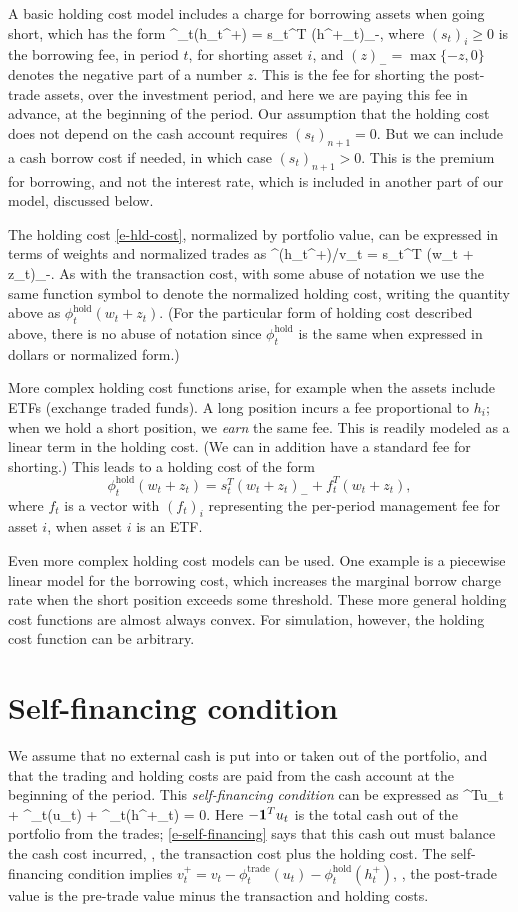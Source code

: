 \documentclass[openany]{article}  %
\newcommand{\trcost}{\phi^\mathrm{trade}}
\newcommand{\hldcost}{\phi^\mathrm{hold}}
\begin{document}
A basic holding cost model includes
a charge for borrowing assets when going short, which has the form
\BEQ\label{e-hld-cost}
\hldcost_t(h_t^+) =  s_t^T (h^+_t)_-,
\EEQ
where $(s_t)_i \geq 0$ is the borrowing fee,
in period $t$, for shorting asset $i$,
and $(z)_- =\max\{-z,0\}$ denotes the negative part of a number $z$.
This is the fee for shorting
the post-trade assets, over the investment period, and here we are paying this
fee in advance, at the beginning of the period.
Our assumption that the holding cost does not depend on the cash account
requires $(s_t)_{n+1} =0$.  But we can include a cash borrow cost if needed,
in which case $(s_t)_{n+1}>0$.  This is the premium for borrowing, and not
the interest rate, which is included in another part of our model,
discussed below.

The holding cost \eqref{e-hld-cost}, normalized by portfolio value,
can be expressed in terms of weights and normalized trades as
\BEQ\label{e-hld-cost-weights}
\hldcost(h_t^+)/v_t =  s_t^T (w_t + z_t)_-.
\EEQ
As with the transaction cost, with some abuse of notation
we use the same function symbol to denote the normalized holding cost,
writing the quantity above as $\hldcost_t(w_t+z_t)$.
(For the particular form of holding cost described above, there is no abuse of
notation since $\hldcost_t$ is the same when expressed in dollars or
normalized form.)

More complex holding cost functions
arise, for example when the assets include ETFs (exchange traded funds).
A long position incurs a fee proportional to $h_i$;
when we hold a short position, we \emph{earn} the same fee.  This is readily modeled
as a linear term in the holding cost.  (We can in addition have a standard fee
for shorting.)  This leads to a holding cost of the form
\[
\hldcost_t (w_t+z_t) = s_t^T (w_t + z_t)_- + f_t^T(w_t+z_t),
\]
where $f_t$ is a vector with $(f_t)_i$ representing the per-period
management fee for asset $i$, when asset $i$ is an ETF.

Even more complex holding cost models can be used.
One example is a piecewise linear
model for the borrowing cost, which increases the marginal borrow charge rate
when the short position exceeds some threshold.
These more general holding cost functions are almost always convex.
For simulation, however, the holding cost function can be arbitrary.

\section{Self-financing condition}
We assume that no external cash is put into or taken out of the portfolio,
and that the trading and holding costs are paid from the cash account
at the beginning of the period.
This \emph{self-financing condition} can be expressed as
\BEQ\label{e-self-financing}
\ones^Tu_t + \trcost_t(u_t) + \hldcost_t(h^+_t) = 0.
\EEQ
Here $-\mathbf 1^Tu_t$ is the total cash out of the portfolio from the trades;
\eqref{e-self-financing} says that this cash out must balance the cash cost
incurred, \ie, the transaction cost plus the holding cost.
The self-financing condition implies
$v_t^+ = v_t - \trcost_t(u_t) - \hldcost_t(h^+_t)$, \ie,
the post-trade value is the pre-trade value minus the transaction
and holding costs.
\end{document}
